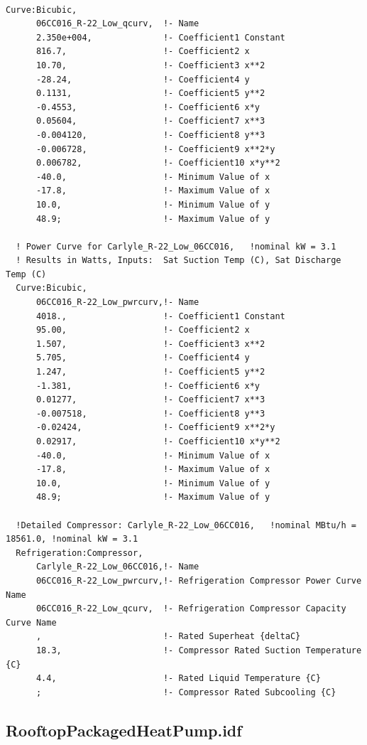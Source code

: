 \begin{lstlisting}

Curve:Bicubic,
      06CC016_R-22_Low_qcurv,  !- Name
      2.350e+004,              !- Coefficient1 Constant
      816.7,                   !- Coefficient2 x
      10.70,                   !- Coefficient3 x**2
      -28.24,                  !- Coefficient4 y
      0.1131,                  !- Coefficient5 y**2
      -0.4553,                 !- Coefficient6 x*y
      0.05604,                 !- Coefficient7 x**3
      -0.004120,               !- Coefficient8 y**3
      -0.006728,               !- Coefficient9 x**2*y
      0.006782,                !- Coefficient10 x*y**2
      -40.0,                   !- Minimum Value of x
      -17.8,                   !- Maximum Value of x
      10.0,                    !- Minimum Value of y
      48.9;                    !- Maximum Value of y

  ! Power Curve for Carlyle_R-22_Low_06CC016,   !nominal kW = 3.1
  ! Results in Watts, Inputs:  Sat Suction Temp (C), Sat Discharge Temp (C)
  Curve:Bicubic,
      06CC016_R-22_Low_pwrcurv,!- Name
      4018.,                   !- Coefficient1 Constant
      95.00,                   !- Coefficient2 x
      1.507,                   !- Coefficient3 x**2
      5.705,                   !- Coefficient4 y
      1.247,                   !- Coefficient5 y**2
      -1.381,                  !- Coefficient6 x*y
      0.01277,                 !- Coefficient7 x**3
      -0.007518,               !- Coefficient8 y**3
      -0.02424,                !- Coefficient9 x**2*y
      0.02917,                 !- Coefficient10 x*y**2
      -40.0,                   !- Minimum Value of x
      -17.8,                   !- Maximum Value of x
      10.0,                    !- Minimum Value of y
      48.9;                    !- Maximum Value of y

  !Detailed Compressor: Carlyle_R-22_Low_06CC016,   !nominal MBtu/h = 18561.0, !nominal kW = 3.1
  Refrigeration:Compressor,
      Carlyle_R-22_Low_06CC016,!- Name
      06CC016_R-22_Low_pwrcurv,!- Refrigeration Compressor Power Curve Name
      06CC016_R-22_Low_qcurv,  !- Refrigeration Compressor Capacity Curve Name
      ,                        !- Rated Superheat {deltaC}
      18.3,                    !- Compressor Rated Suction Temperature {C}
      4.4,                     !- Rated Liquid Temperature {C}
      ;                        !- Compressor Rated Subcooling {C}
\end{lstlisting}

\subsection{RooftopPackagedHeatPump.idf}\label{rooftoppackagedheatpump.idf}

